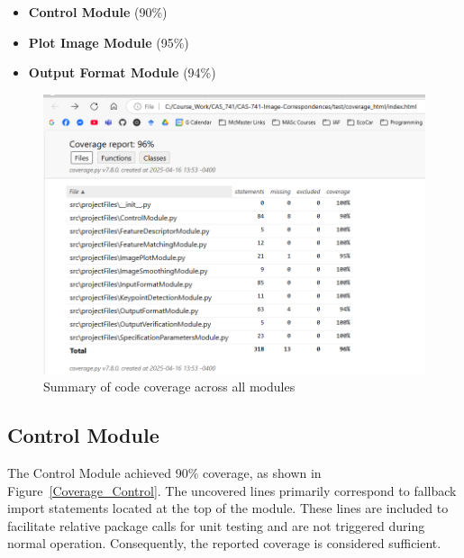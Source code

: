 \documentclass[12pt, titlepage]{article}
\begin{document}
\begin{itemize}
  \item \textbf{Control Module} (90\%)
  \item \textbf{Plot Image Module} (95\%)
  \item \textbf{Output Format Module} (94\%)
\end{itemize}

\begin{figure}[h!]
  \centering
  \includegraphics[width=1.00\linewidth]{images/cov_SUM.png}
  \caption{Summary of code coverage across all modules}
  \label{Coverage_Summary}
\end{figure}

\subsection{Control Module}
The Control Module achieved 90\% coverage, as shown in Figure~\ref{Coverage_Control}. The uncovered lines primarily correspond to fallback import statements located at the top of the module. These lines are included to facilitate relative package calls for unit testing and are not triggered during normal operation. Consequently, the reported coverage is considered sufficient.
\end{document}
